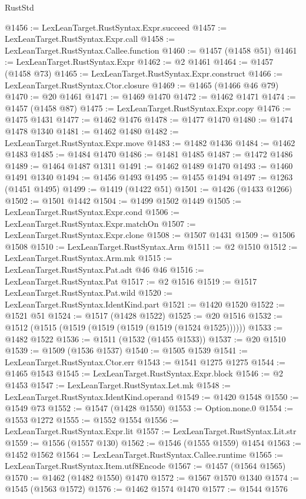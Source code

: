 \begin{lexlean}{RustStd}
\begin{coremodule}
{\begin{coremodule}
{{{{{{{{{{{{{{{{{{{{{{{{{{{{{{@1456 := LexLeanTarget.RustSyntax.Expr.succeed
@1457 := LexLeanTarget.RustSyntax.Expr.call
@1458 := LexLeanTarget.RustSyntax.Callee.function
@1460 := @1457 (@1458 @51)
@1461 := LexLeanTarget.RustSyntax.Expr
@1462 := @2 @1461
@1464 := @1457 (@1458 @73)
@1465 := LexLeanTarget.RustSyntax.Expr.construct
@1466 := LexLeanTarget.RustSyntax.Ctor.closure
@1469 := @1465 (@1466 @46 @79)
@1470 := @20 @1461
@1471 := @1469 @1470
@1472 := @1462 @1471
@1474 := @1457 (@1458 @87)
@1475 := LexLeanTarget.RustSyntax.Expr.copy
@1476 := @1475 @1431
@1477 := @1462 @1476
@1478 := @1477 @1470
@1480 := @1474 @1478 @1340
@1481 := @1462 @1480
@1482 := LexLeanTarget.RustSyntax.Expr.move
@1483 := @1482 @1436
@1484 := @1462 @1483
@1485 := @1484 @1470
@1486 := @1481 @1485
@1487 := @1472 @1486
@1489 := @1464 @1487 @1311
@1491 := @1462 @1489 @1470
@1493 := @1460 @1491 @1340
@1494 := @1456 @1493
@1495 := @1455 @1494
@1497 := @1263 (@1451 @1495)
@1499 := @1419 (@1422 @51)
@1501 := @1426 (@1433 @1266)
@1502 := @1501 @1442
@1504 := @1499 @1502 @1449
@1505 := LexLeanTarget.RustSyntax.Expr.cond
@1506 := LexLeanTarget.RustSyntax.Expr.matchOn
@1507 := LexLeanTarget.RustSyntax.Expr.clone
@1508 := @1507 @1431
@1509 := @1506 @1508
@1510 := LexLeanTarget.RustSyntax.Arm
@1511 := @2 @1510
@1512 := LexLeanTarget.RustSyntax.Arm.mk
@1515 := LexLeanTarget.RustSyntax.Pat.adt @46 @46
@1516 := LexLeanTarget.RustSyntax.Pat
@1517 := @2 @1516
@1519 := @1517 LexLeanTarget.RustSyntax.Pat.wild
@1520 := LexLeanTarget.RustSyntax.IdentKind.part
@1521 := @1420 @1520
@1522 := @1521 @51
@1524 := @1517 (@1428 @1522)
@1525 := @20 @1516
@1532 := @1512 (@1515 (@1519 (@1519 (@1519 (@1519 (@1524 @1525))))))
@1533 := @1482 @1522
@1536 := @1511 (@1532 (@1455 @1533))
@1537 := @20 @1510
@1539 := @1509 (@1536 @1537)
@1540 := @1505 @1539
@1541 := LexLeanTarget.RustSyntax.Ctor.err
@1543 := @1541 @1275 @1275
@1544 := @1465 @1543
@1545 := LexLeanTarget.RustSyntax.Expr.block
@1546 := @2 @1453
@1547 := LexLeanTarget.RustSyntax.Let.mk
@1548 := LexLeanTarget.RustSyntax.IdentKind.operand
@1549 := @1420 @1548
@1550 := @1549 @73
@1552 := @1547 (@1428 @1550)
@1553 := Option.none.{0}
@1554 := @1553 @1272
@1555 := @1552 @1554
@1556 := LexLeanTarget.RustSyntax.Expr.lit
@1557 := LexLeanTarget.RustSyntax.Lit.str
@1559 := @1556 (@1557 @130)
@1562 := @1546 (@1555 @1559) @1454
@1563 := @1452 @1562
@1564 := LexLeanTarget.RustSyntax.Callee.runtime
@1565 := LexLeanTarget.RustSyntax.Item.utf8Encode
@1567 := @1457 (@1564 @1565)
@1570 := @1462 (@1482 @1550) @1470
@1572 := @1567 @1570 @1340
@1574 := @1545 (@1563 @1572)
@1576 := @1462 @1574 @1470
@1577 := @1544 @1576
}}}}}}}}}}}}}}}}}}}}}}}}}}}}}}
\end{coremodule}}
\end{coremodule}
\end{lexlean}
